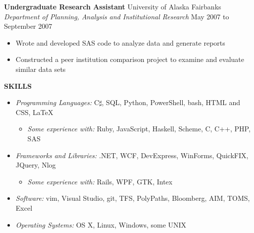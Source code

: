 \documentclass{article}
\begin{document}
\begin{flushleft}
\hspace{20pt}
\textbf{Undergraduate Research Assistant} \hfill University of Alaska Fairbanks\\
\hspace{20pt}
\textit{Department of Planning, Analysis and Institutional Research} \hfill May 2007 to September 2007\\
\begin{itemize}[leftmargin=50pt,itemsep=-2pt]
\item Wrote and developed SAS code to analyze data and generate reports
\item Constructed a peer institution comparison project to examine and evaluate similar data sets
\end{itemize}

\vspace{5pt}
\textbf{SKILLS}\\
\begin{itemize}[leftmargin=20pt,itemsep=-2pt]
\item[] \textit{Programming Languages:} C$\sharp$, SQL, Python, PowerShell, bash, HTML and CSS, \LaTeX\\
    \begin{itemize}[leftmargin=20pt,itemsep=-2pt,nosep]
        \item[] \textit{Some experience with:} Ruby, JavaScript, Haskell, Scheme, C, C++, PHP, SAS
    \end{itemize}
\item[] \textit{Frameworks and Libraries:} .NET, WCF, DevExpress, WinForms, QuickFIX, JQuery, Nlog\\
    \begin{itemize}[leftmargin=20pt,itemsep=-2pt,nosep]
        \item[] \textit{Some experience with:} Rails, WPF, GTK, Intex
    \end{itemize}
\item[] \textit{Software:} vim, Visual Studio, git, TFS, PolyPaths, Bloomberg, AIM, TOMS, Excel\\
\item[] \textit{Operating Systems:} OS X, Linux, Windows, some UNIX\\
\end{itemize}

\end{flushleft}
\end{document}
